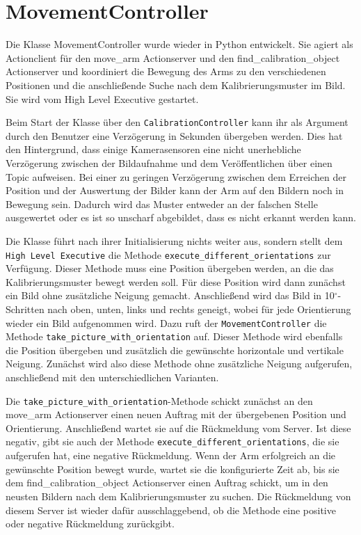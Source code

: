 \section{MovementController} %
\label{sec:movementcontroller_impl}
Die Klasse MovementController wurde wieder in Python entwickelt. Sie agiert als Actionclient für den move\_arm Actionserver und den find\_calibration\_object Actionserver und koordiniert die Bewegung des Arms zu den verschiedenen Positionen und die anschließende Suche nach dem Kalibrierungsmuster im Bild. Sie wird vom High Level Executive gestartet.

Beim Start der Klasse über den \texttt{CalibrationController} kann ihr als Argument durch den Benutzer eine Verzögerung in Sekunden übergeben werden. Dies hat den Hintergrund, dass einige Kamerasensoren eine nicht unerhebliche Verzögerung zwischen der Bildaufnahme und dem Veröffentlichen über einen Topic aufweisen. Bei einer zu geringen Verzögerung zwischen dem Erreichen der Position und der Auswertung der Bilder kann der Arm auf den Bildern noch in Bewegung sein. Dadurch wird das Muster entweder an der falschen Stelle ausgewertet oder es ist so unscharf abgebildet, dass es nicht erkannt werden kann.

Die Klasse führt nach ihrer Initialisierung nichts weiter aus, sondern stellt dem \texttt{High Level Executive} die Methode \texttt{execute\_different\_orientations} zur Verfügung. Dieser Methode muss eine Position übergeben werden, an die das Kalibrierungsmuster bewegt werden soll. Für diese Position wird dann zunächst ein Bild ohne zusätzliche Neigung gemacht. Anschließend wird das Bild in 10$^\circ$-Schritten nach oben, unten, links und rechts geneigt, wobei für jede Orientierung wieder ein Bild aufgenommen wird. Dazu ruft der \texttt{MovementController} die Methode \texttt{take\_picture\_with\_orientation} auf. Dieser Methode wird ebenfalls die Position übergeben und zusätzlich die gewünschte horizontale und vertikale Neigung. Zunächst wird also diese Methode ohne zusätzliche Neigung aufgerufen, anschließend mit den unterschiedlichen Varianten.

Die \texttt{take\_picture\_with\_orientation}-Methode schickt zunächst an den move\_arm Actionserver einen neuen Auftrag mit der übergebenen Position und Orientierung. Anschließend wartet sie auf die Rückmeldung vom Server. Ist diese negativ, gibt sie auch der Methode \texttt{execute\_different\_orientations}, die sie aufgerufen hat, eine negative Rückmeldung. Wenn der Arm erfolgreich an die gewünschte Position bewegt wurde, wartet sie die konfigurierte Zeit ab, bis sie dem find\_calibration\_object Actionserver einen Auftrag schickt, um in den neusten Bildern nach dem Kalibrierungsmuster zu suchen. Die Rückmeldung von diesem Server ist wieder dafür ausschlaggebend, ob die Methode eine positive oder negative Rückmeldung zurückgibt.

